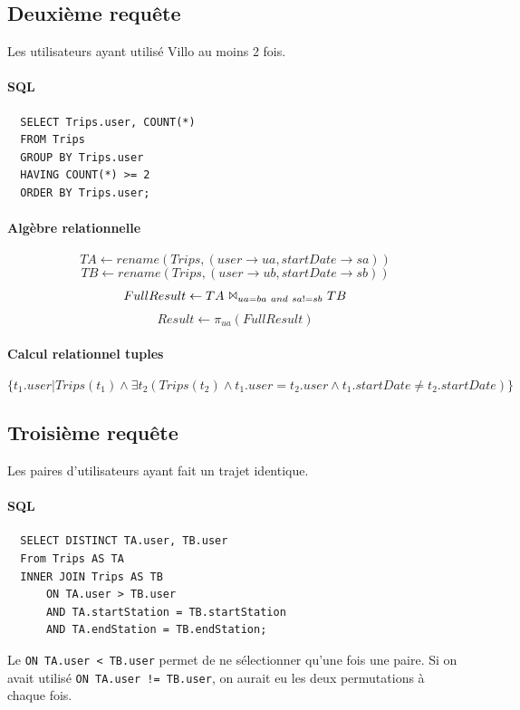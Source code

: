 \documentclass[a4paper]{article}
\begin{document}
\subsection{Deuxième requête}
	Les utilisateurs ayant utilisé Villo au moins 2 fois.

	\paragraph{SQL}
  \begin{verbatim}
  SELECT Trips.user, COUNT(*)
  FROM Trips
  GROUP BY Trips.user
  HAVING COUNT(*) >= 2
  ORDER BY Trips.user;
  \end{verbatim}
  
  \paragraph{Algèbre relationnelle}
  $$ TA \leftarrow rename(Trips, (user \rightarrow ua, startDate \rightarrow sa)) $$
  $$ TB \leftarrow rename(Trips, (user \rightarrow ub, startDate \rightarrow sb)) $$
  $$FullResult \leftarrow TA\ \Bowtie_{ua=ba\ and\ sa!=sb}\ TB $$
  $$Result \leftarrow \pi_{ua}(FullResult)$$
  
  \paragraph{Calcul relationnel tuples}
  $$ \{ t_1.user | Trips(t_1) \land \exists t_2 (Trips(t_2) \land t_1.user = t_2.user \land t_1.startDate \neq t_2.startDate)\} $$
  


\subsection{Troisième requête}
	Les paires d'utilisateurs ayant fait un trajet identique.

	\paragraph{SQL}
  \begin{verbatim}
  SELECT DISTINCT TA.user, TB.user
  From Trips AS TA
  INNER JOIN Trips AS TB 
      ON TA.user > TB.user 
      AND TA.startStation = TB.startStation 
      AND TA.endStation = TB.endStation;
  \end{verbatim}
	Le \texttt{ON TA.user < TB.user} permet de ne sélectionner qu'une fois une paire. Si on avait utilisé \texttt{ON TA.user != TB.user}, on aurait eu les deux permutations à chaque fois.
    
\end{document}
